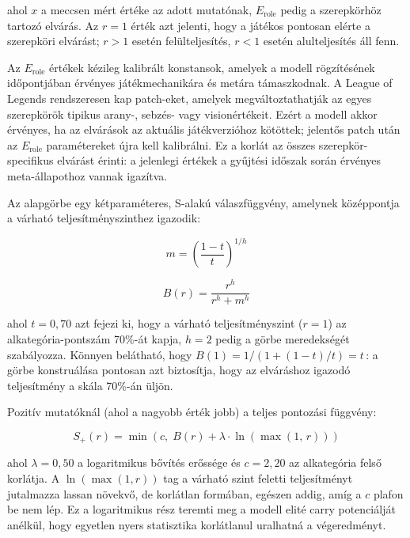 ahol $x$ a meccsen mért értéke az adott mutatónak, $E_{\text{role}}$ pedig a szerepkörhöz tartozó elvárás. Az $r = 1$ érték azt jelenti, hogy a játékos pontosan elérte a szerepköri elvárást; $r > 1$ esetén felülteljesítés, $r < 1$ esetén alulteljesítés áll fenn.

Az $E_{\text{role}}$ értékek kézileg kalibrált konstansok, amelyek a modell rögzítésének időpontjában érvényes játékmechanikára és metára támaszkodnak. A League of Legends rendszeresen kap patch-eket, amelyek megváltoztathatják az egyes szerepkörök tipikus arany-, sebzés- vagy visionértékeit. Ezért a modell akkor érvényes, ha az elvárások az aktuális játékverzióhoz kötöttek; jelentős patch után az $E_{\text{role}}$ paramétereket újra kell kalibrálni. Ez a korlát az összes szerepkör-specifikus elvárást érinti: a jelenlegi értékek a gyűjtési időszak során érvényes meta-állapothoz vannak igazítva.

Az alapgörbe egy kétparaméteres, S-alakú válaszfüggvény, amelynek középpontja a várható teljesítményszinthez igazodik:

\begin{equation}
m = \left(\frac{1-t}{t}\right)^{1/h}
\end{equation}

\begin{equation}
B(r) = \frac{r^h}{r^h + m^h}
\end{equation}

ahol $t = 0{,}70$ azt fejezi ki, hogy a várható teljesítményszint ($r = 1$) az alkategória-pontszám 70\%-át kapja, $h = 2$ pedig a görbe meredekségét szabályozza. Könnyen belátható, hogy $B(1) = 1/(1 + (1-t)/t) = t$\,: a görbe konstruálása pontosan azt biztosítja, hogy az elváráshoz igazodó teljesítmény a skála 70\%-án üljön.

Pozitív mutatóknál (ahol a nagyobb érték jobb) a teljes pontozási függvény:

\begin{equation}
S_+(r) = \min\!\left(c,\; B(r) + \lambda \cdot \ln\!\left(\max(1,\, r)\right)\right)
\end{equation}

ahol $\lambda = 0{,}50$ a logaritmikus bővítés erőssége és $c = 2{,}20$ az alkategória felső korlátja. A $\ln(\max(1, r))$ tag a várható szint feletti teljesítményt jutalmazza lassan növekvő, de korlátlan formában, egészen addig, amíg a $c$ plafon be nem lép. Ez a logaritmikus rész teremti meg a modell elité carry potenciálját anélkül, hogy egyetlen nyers statisztika korlátlanul uralhatná a végeredményt.


